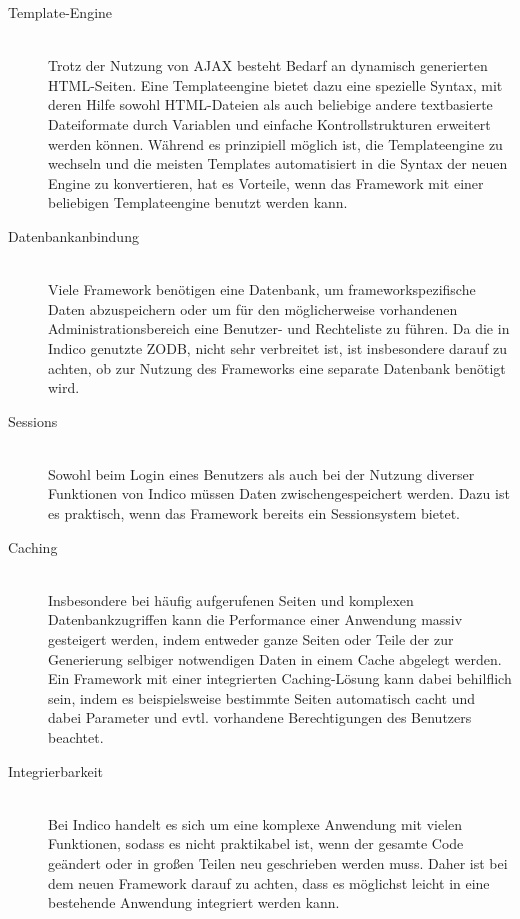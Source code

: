 \begin{description}
\item[Template-Engine] \hfill \\
Trotz der Nutzung von AJAX besteht Bedarf an dynamisch generierten HTML-Seiten. Eine Templateengine
bietet dazu eine spezielle Syntax, mit deren Hilfe sowohl HTML-Dateien als auch beliebige andere
textbasierte Dateiformate durch Variablen und einfache Kontrollstrukturen erweitert werden können.
Während es prinzipiell möglich ist, die Templateengine zu wechseln und die meisten Templates
automatisiert in die Syntax der neuen Engine zu konvertieren, hat es Vorteile, wenn das Framework
mit einer beliebigen Templateengine benutzt werden kann.

\item[Datenbankanbindung] \hfill \\
Viele Framework benötigen eine Datenbank, um frameworkspezifische Daten abzuspeichern oder um für
den möglicherweise vorhandenen Administrationsbereich eine Benutzer- und Rechteliste zu führen. Da
die in Indico genutzte ZODB, nicht sehr verbreitet ist, ist insbesondere darauf zu achten, ob zur
Nutzung des Frameworks eine separate Datenbank benötigt wird.

\item[Sessions] \hfill \\
Sowohl beim Login eines Benutzers als auch bei der Nutzung diverser Funktionen von Indico müssen
Daten zwischengespeichert werden. Dazu ist es praktisch, wenn das Framework bereits ein
Sessionsystem bietet.

\item[Caching] \hfill \\
Insbesondere bei häufig aufgerufenen Seiten und komplexen Datenbankzugriffen kann die Performance
einer Anwendung massiv gesteigert werden, indem entweder ganze Seiten oder Teile der zur Generierung
selbiger notwendigen Daten in einem Cache abgelegt werden. Ein Framework mit einer integrierten
Caching-Lösung kann dabei behilflich sein, indem es beispielsweise bestimmte Seiten automatisch
cacht und dabei Parameter und evtl. vorhandene Berechtigungen des Benutzers beachtet.

\item[Integrierbarkeit] \hfill \\
Bei Indico handelt es sich um eine komplexe Anwendung mit vielen Funktionen, sodass es nicht
praktikabel ist, wenn der gesamte Code geändert oder in großen Teilen neu geschrieben werden muss.
Daher ist bei dem neuen Framework darauf zu achten, dass es möglichst leicht in eine bestehende
Anwendung integriert werden kann.


\end{description}
